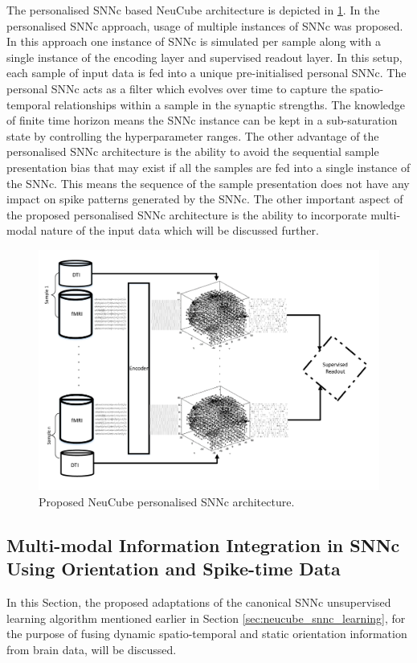 The personalised SNNc based NeuCube architecture is depicted in \figurename \ref{fig:personaliosed_arch}. In the personalised SNNc approach, usage of multiple instances of SNNc was proposed. In this approach one instance of SNNc is simulated per sample along with a single instance of the encoding layer and supervised readout layer. In this setup, each sample of input data is fed into a unique pre-initialised personal SNNc. The personal SNNc acts as a filter which evolves over time to capture the spatio-temporal relationships within a sample in the synaptic strengths. The knowledge of finite time horizon means the SNNc instance can be kept in a sub-saturation state by controlling the hyperparameter ranges. The other advantage of the personalised SNNc architecture is the ability to avoid the sequential sample presentation bias that may exist if all the samples are fed into a single instance of the SNNc. This means the sequence of the sample presentation does not have any impact on spike patterns generated by the SNNc. The other important aspect of the proposed personalised SNNc architecture is the ability to incorporate multi-modal nature of the input data which will be discussed further.   

\begin{figure}
	\includegraphics[width=0.8\linewidth]{fig/fmridti/neucube_personalised_arch.pdf}
	\caption{Proposed NeuCube personalised SNNc architecture.}
	\label{fig:personaliosed_arch}
\end{figure}


\subsection{Multi-modal Information Integration in SNNc Using Orientation and Spike-time Data}
\label{sec: SNNc}
In this Section, the proposed adaptations of the canonical SNNc unsupervised learning algorithm mentioned earlier in Section \ref{sec:neucube_snnc_learning}, for the purpose of fusing dynamic spatio-temporal and static orientation information from brain data, will be discussed. 

